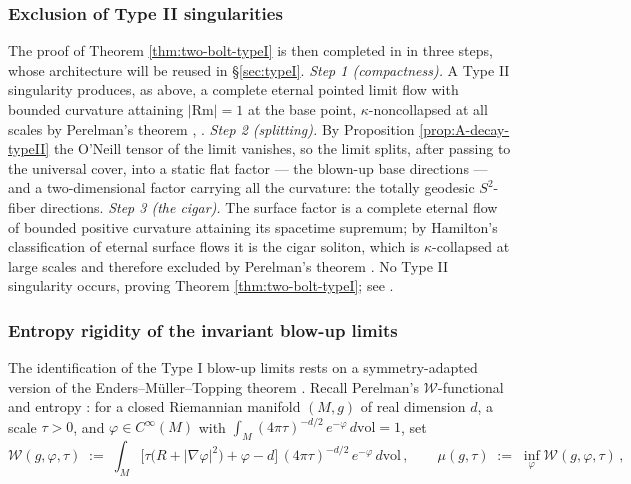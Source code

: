 \documentclass[11pt]{amsart}
\theoremstyle{plain}
\numberwithin{equation}{section}
\theoremstyle{definition}
\theoremstyle{remark}
\begin{document}
\subsubsection{Exclusion of Type II singularities}\label{subsec:two-bolt-no-typeII}

The proof of Theorem \ref{thm:two-bolt-typeI} is then completed in \cite{FT} in three steps, whose architecture will be reused in \S\ref{sec:typeI}. \emph{Step 1 (compactness).} A Type II singularity produces, as above, a complete eternal pointed limit flow with bounded curvature attaining $| \mathrm{Rm} | = 1$ at the base point, $\kappa$-noncollapsed at all scales by Perelman's theorem \cite{Perelman}, \cite{HamCompact}. \emph{Step 2 (splitting).} By Proposition \ref{prop:A-decay-typeII} the O'Neill tensor of the limit vanishes, so the limit splits, after passing to the universal cover, into a static flat factor --- the blown-up base directions --- and a two-dimensional factor carrying all the curvature: the totally geodesic $S^2$-fiber directions. \emph{Step 3 (the cigar).} The surface factor is a complete eternal flow of bounded positive curvature attaining its spacetime supremum; by Hamilton's classification of eternal surface flows \cite{HamSurvey} it is the cigar soliton, which is $\kappa$-collapsed at large scales and therefore excluded by Perelman's theorem \cite{Perelman}. No Type II singularity occurs, proving Theorem \ref{thm:two-bolt-typeI}; see \cite[\S 4.4]{FT}.

\subsubsection{Entropy rigidity of the invariant blow-up limits}\label{subsec:entropy-rigidity}

The identification of the Type I blow-up limits rests on a symmetry-adapted version of the Enders--M\"uller--Topping theorem \cite{EMT}. Recall Perelman's $\mathcal{W}$-functional and entropy \cite{Perelman}: for a closed Riemannian manifold $( M, g )$ of real dimension $d$, a scale $\tau > 0$, and $\varphi \in C^\infty ( M )$ with $\int_M ( 4 \pi \tau )^{- d / 2}\, e^{- \varphi}\, d\mathrm{vol} = 1$, set
\[
\mathcal{W} ( g, \varphi, \tau ) \;:=\; \int_M \Big[ \tau \big( R + | \nabla \varphi |^2 \big) + \varphi - d \Big]\, ( 4 \pi \tau )^{- d / 2}\, e^{- \varphi}\, d\mathrm{vol} \,, \qquad \mu ( g, \tau ) \;:=\; \inf_{\varphi} \mathcal{W} ( g, \varphi, \tau ) \,,
\]
\end{document}
